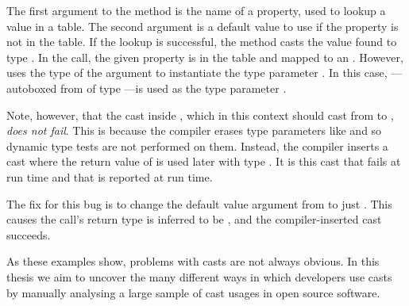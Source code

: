 The first argument to the method is the name of a property,
used to lookup a value in a table.
The second argument is a default value to use if the property is not in the table.
If the lookup is successful,
the method casts the value found to type .
In the call, the given property
 is in the table and mapped to an .
However, \java{} uses the type of the  argument 
to instantiate the type parameter .
In this case, ---autoboxed from  of type ---is used as the type parameter .

Note, however, that the cast inside , which in this context
should cast from  to , \emph{does not fail}.
This is because the \java{} compiler erases type
parameters like  and so dynamic type tests are not performed on them.
Instead, the compiler inserts a cast where the return value
of  is used later with type .
It is this cast that fails at run time and that is reported at run time.

The fix for this bug is to change the default value argument from 
to just .
This causes the call's return type is inferred to be
, and the compiler-inserted cast succeeds.

As these examples show, problems with casts are not always obvious.
In this thesis we aim to uncover the many different ways in which developers use casts
by manually analysing a large sample of cast usages in open source software.